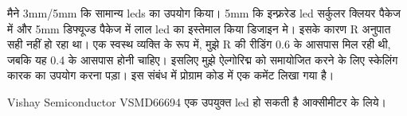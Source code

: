 		मैने 3mm/5mm कि सामान्य leds का उपयोग किया। 5mm कि इन्फ़्ररेड led सर्कुलर क्लियर पैकेज में और 5mm डिफ्यूज्ड पैकेज में लाल led का इस्तेमाल किया डिजाइन मे। इसके कारण R अनुपात सही नहीं हो रहा था। एक स्वस्थ व्यक्ति के रूप में, मुझे R की रीडिंग 0.6 के आसपास मिल रही थी, जबकि यह 0.4 के आसपास होनी चाहिए। इसलिए मुझे ऐल्गोरिद्म को समायोजित करने के लिए स्केलिंग कारक का उपयोग करना पड़ा। इस संबंध में प्रोग्राम कोड में एक कमेंट लिखा गया है। 
		
		Vishay Semiconductor VSMD66694 एक उपयुक्त led हो सकती है आक्सीमीटर के लिये। 
			
		  
	
